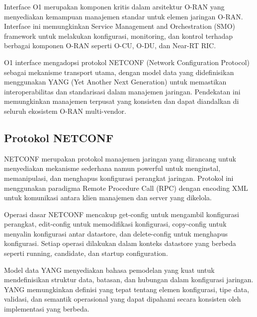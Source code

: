 Interface O1 merupakan komponen kritis dalam arsitektur O-RAN yang menyediakan kemampuan manajemen standar untuk elemen jaringan O-RAN. Interface ini memungkinkan Service Management and Orchestration (SMO) framework untuk melakukan konfigurasi, monitoring, dan kontrol terhadap berbagai komponen O-RAN seperti O-CU, O-DU, dan Near-RT RIC.


O1 interface mengadopsi protokol NETCONF (Network Configuration Protocol) sebagai mekanisme transport utama, dengan model data yang didefinisikan menggunakan YANG (Yet Another Next Generation) untuk memastikan interoperabilitas dan standarisasi dalam manajemen jaringan. Pendekatan ini memungkinkan manajemen terpusat yang konsisten dan dapat diandalkan di seluruh ekosistem O-RAN multi-vendor.

\subsection{Protokol NETCONF}

NETCONF merupakan protokol manajemen jaringan yang dirancang untuk menyediakan mekanisme sederhana namun powerful untuk menginstal, memanipulasi, dan menghapus konfigurasi perangkat jaringan. Protokol ini menggunakan paradigma Remote Procedure Call (RPC) dengan encoding XML untuk komunikasi antara klien manajemen dan server yang dikelola.


Operasi dasar NETCONF mencakup get-config untuk mengambil konfigurasi perangkat, edit-config untuk memodifikasi konfigurasi, copy-config untuk menyalin konfigurasi antar datastore, dan delete-config untuk menghapus konfigurasi. Setiap operasi dilakukan dalam konteks datastore yang berbeda seperti running, candidate, dan startup configuration.

Model data YANG menyediakan bahasa pemodelan yang kuat untuk mendefinisikan struktur data, batasan, dan hubungan dalam konfigurasi jaringan. YANG memungkinkan definisi yang tepat tentang elemen konfigurasi, tipe data, validasi, dan semantik operasional yang dapat dipahami secara konsisten oleh implementasi yang berbeda.

